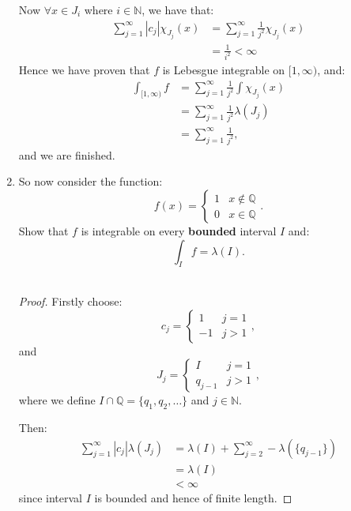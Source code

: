 \begin{enumerate}
    Now $\forall x\in J_i$ where $i\in\mathbb{N}$, we have that:
    \begin{align*}
        \sum_{j=1}^{\infty}|c_j| \chi_{J_j}(x)
        &=\sum_{j=1}^{\infty}\frac{1}{j^2}\chi_{J_j}(x) \\
        &=\frac{1}{i^2}<\infty
    \end{align*}
    Hence we have proven that $f$ is Lebesgue integrable on $[1,\infty)$, and:
    \begin{align*}
        \int_{[1,\infty)} f
        &=\sum_{j=1}^{\infty}\frac{1}{j^2}
        \int\chi_{J_j}(x) \\
        &=\sum_{j=1}^{\infty}\frac{1}{j^2}\lambda(J_j) \\
        &=\sum_{j=1}^{\infty}\frac{1}{j^2},
    \end{align*}
    and we are finished.
    
    \newpage

    \item So now consider the function:
    $$f(x)=\left\{
    \begin{array}{ll}
	1  & \mbox{} x \notin\mathbb{Q} \\
	0 & \mbox{} x\in\mathbb{Q}
    \end{array}.
    \right.$$
    Show that $f$ is integrable on every \textbf{bounded} interval $I$ and:
    $$\int_I f=\lambda(I).$$ \\

    \begin{proof}
    Firstly choose:
    $$c_j=\left\{
    \begin{array}{ll}
	1  & \mbox{} j=1 \\
	-1 & \mbox{} j>1
    \end{array},
    \right.$$
    and
    $$J_j=\left\{
    \begin{array}{ll}
	I  & \mbox{} j=1 \\
	q_{j-1} & \mbox{} j>1
    \end{array},
    \right.$$
    where we define $I\cap\mathbb{Q}=\{q_1,q_2,\dots\}$ and $j\in\mathbb{N}$.

    Then:
    \begin{align*}
        \sum_{j=1}^{\infty}|c_j|\lambda(J_j)
        &=\lambda(I)+\sum_{j=2}^{\infty}-\lambda(\{q_{j-1}\}) \\
        &=\lambda(I) \\
        &<\infty
    \end{align*}
    since interval $I$ is bounded and hence of finite length.


\end{proof}
\end{enumerate}
